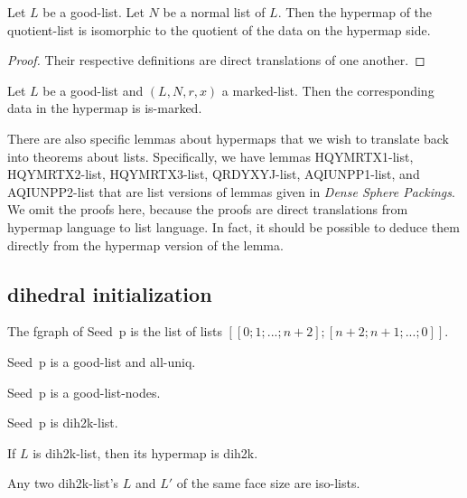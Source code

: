 \begin{lemma} Let $L$ be a good-list.  Let $N$ be a normal list of $L$.
Then the hypermap of the quotient-list is isomorphic to the quotient of the data
on the hypermap side.
\end{lemma}

\begin{proof} Their respective definitions are direct translations of one another.
\end{proof}

\begin{lemma}  Let $L$ be a good-list and $(L,N,r,x)$ a marked-list.
Then the corresponding data in the hypermap is is-marked.
\end{lemma}

There are also specific lemmas about hypermaps that we wish to translate back into theorems
about lists.  Specifically, we have lemmas HQYMRTX1-list, HQYMRTX2-list, HQYMRTX3-list,
QRDYXYJ-list, AQIUNPP1-list, and AQIUNPP2-list that are list versions of lemmas given in {\it Dense Sphere Packings}.
We omit the proofs here, because the proofs are direct translations from hypermap language to list language.
In fact, it should be possible to deduce them directly from the hypermap version of the lemma.


\subsection{dihedral  initialization}

The fgraph of Seed~p is the list of lists $[[0;1;...;n+2];[n+2;n+1;...;0]]$.

\begin{lemma} 
 Seed~p is a good-list and all-uniq.
\end{lemma}

\begin{lemma} Seed~p is a good-list-nodes.
\end{lemma}

\begin{lemma}  Seed~p is dih2k-list.
\end{lemma}

\begin{lemma} If $L$ is dih2k-list, then its hypermap is dih2k.
\end{lemma}

\begin{lemma} Any two dih2k-list's $L$ and $L'$ of the same face size are iso-lists.
\end{lemma}


